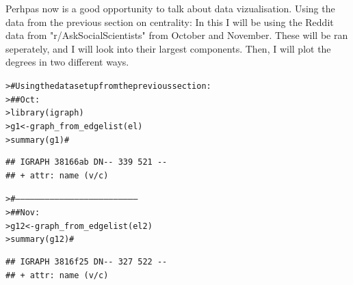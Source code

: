 \documentclass[12pt]{article}\usepackage[]{graphicx}\usepackage[]{color}
\makeatletter
\newcommand{\hlcom}[1]{\textcolor[rgb]{0.404,0.408,0.42}{#1}}%
\newcommand{\hlstd}[1]{\textcolor[rgb]{0.882,0.878,0.898}{#1}}%
\newcommand{\hlkwb}[1]{\textcolor[rgb]{0.902,0.675,0.196}{#1}}%
\newcommand{\hlkwd}[1]{\textcolor[rgb]{0.733,0.388,0.812}{#1}}%
\newenvironment{kframe}{%
 \def\at@end@of@kframe{}%
 \ifinner\ifhmode%
  \def\at@end@of@kframe{\end{minipage}}%
  \begin{minipage}{\columnwidth}%
 \fi\fi%
 \def\FrameCommand##1{\hskip\@totalleftmargin \hskip-\fboxsep
 \colorbox{shadecolor}{##1}\hskip-\fboxsep
     \hskip-\linewidth \hskip-\@totalleftmargin \hskip\columnwidth}%
 \MakeFramed {\advance\hsize-\width
   \@totalleftmargin\z@ \linewidth\hsize
   \@setminipage}}%
 {\par\unskip\endMakeFramed%
 \at@end@of@kframe}
\newenvironment{knitrout}{}{} %
\makeatother
\begin{document}
\begin{flushleft}
Perhpas now is a good opportunity to talk about data vizualisation. Using the data from the previous section on centrality:
In this I will be using the Reddit data from "r/AskSocialScientists" from October and November. These will be ran seperately, and I will look into their largest components. Then, I will plot the degrees in two different ways.

\begin{knitrout}
\color{fgcolor}\begin{kframe}
\begin{alltt}
\hlstd{> }\hlcom{# Using the data set up from the previous section:}
\hlstd{> }\hlcom{##    Oct:}
\hlstd{> }\hlkwd{library}\hlstd{(igraph)}
\hlstd{> }\hlstd{g1} \hlkwb{<-} \hlkwd{graph_from_edgelist}\hlstd{(el)}
\hlstd{> }\hlkwd{summary}\hlstd{(g1)} \hlcom{#}
\end{alltt}
\begin{verbatim}
## IGRAPH 38166ab DN-- 339 521 -- 
## + attr: name (v/c)
\end{verbatim}
\begin{alltt}
\hlstd{> }\hlcom{#---------------------------------------------------------------------------}
\hlstd{> }\hlcom{##   Nov:}
\hlstd{> }\hlstd{g12} \hlkwb{<-} \hlkwd{graph_from_edgelist}\hlstd{(el2)}
\hlstd{> }\hlkwd{summary}\hlstd{(g12)} \hlcom{#}
\end{alltt}
\begin{verbatim}
## IGRAPH 3816f25 DN-- 327 522 -- 
## + attr: name (v/c)
\end{verbatim}
\end{kframe}
\end{knitrout}


\end{flushleft}
\end{document}
